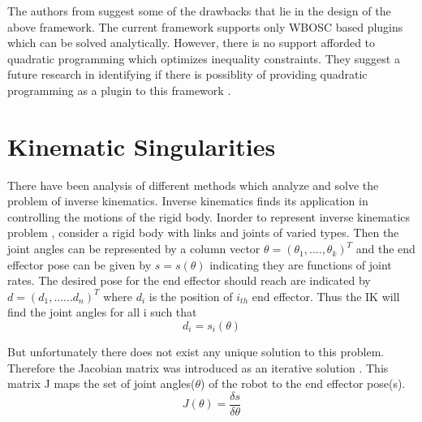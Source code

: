 The authors from \cite{fok2016controlit} suggest some of the drawbacks that lie in the design of the above framework. The current framework supports only WBOSC based plugins which can be solved analytically. However, there is no support afforded to quadratic programming \cite{escande2014hierarchical} which optimizes inequality constraints. They suggest a future research in identifying if there is possiblity of providing quadratic programming as a plugin to this framework \cite{fok2016controlit}. 
\section{Kinematic Singularities}
There have been analysis of different methods which analyze  and solve the problem of inverse kinematics. Inverse kinematics finds its application in controlling the motions of the rigid body. Inorder to represent inverse kinematics problem , consider a rigid body with links and joints of varied types. Then the joint angles can be represented by a column vector $\theta = (\theta_{1},....,\theta_{k})^{T}$ and the end effector pose can be given by $s = s(\theta)$ indicating they are functions of joint rates. The desired pose for the end effector should reach are indicated by $d = (d_{1},......d_{n})^{T}$ where $d_{i}$ is the position of $i_{th}$ end effector. Thus the IK will find the joint angles for all i such that
\begin{equation}
d_{i} = s_{i}(\theta)
\end{equation}

 
But unfortunately there does not exist any unique solution to this problem. Therefore the Jacobian matrix was introduced as an iterative solution \cite{Buss2004}. This matrix J maps the set of joint angles($\theta$) of the robot to the end effector pose(s).
\begin{equation}
J(\theta) = \frac{\delta s}{\delta \theta}
\end{equation}



